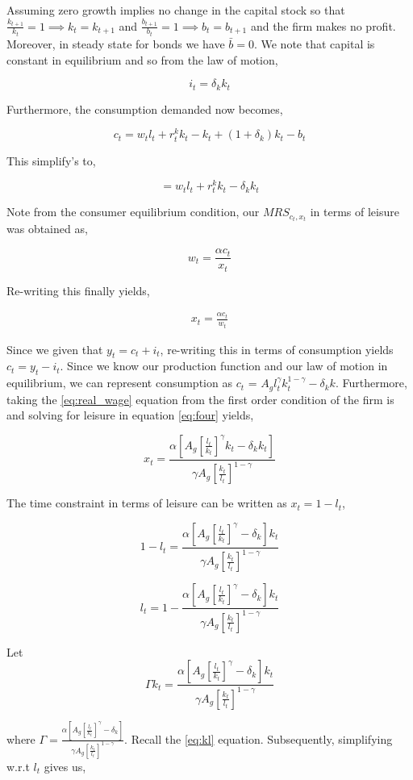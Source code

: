 \documentclass[
  11pt,
  justified]{article}
\begin{document}
Assuming zero growth implies no change in the capital stock so that
\(\frac{k_{t+1}}{k_t} = 1 \implies k_t = k_{t+1}\) and
\(\frac{b_{t+1}}{b_t} = 1 \implies b_t = b_{t+1}\) and the firm makes no
profit. Moreover, in steady state for bonds we have \(\bar b = 0\). We
note that capital is constant in equilibrium and so from the law of
motion,

\[
i_t = \delta_k k_t
\]

Furthermore, the consumption demanded now becomes,

\[
c_t = w_tl_t + r_t^k k_t - k_{t} + (1+\delta_k)k_t - b_{t}
\]

This simplify's to,

\[
= w_tl_t + r_t^k k_t - \delta_kk_t 
\]

Note from the consumer equilibrium condition, our \(MRS_{c_t, x_t}\) in
terms of leisure was obtained as,

\[
w_t = \frac{\alpha c_t}{x_t}
\]

Re-writing this finally yields,

\begin{align}
x_t = \frac{\alpha c_t}{w_t} \tag{4} \label{eq:four}
\end{align}

Since we given that \(y_t = c_t + i_t\), re-writing this in terms of
consumption yields \(c_t = y_t - i_t\). Since we know our production
function and our law of motion in equilibrium, we can represent
consumption as \(c_t\) =
\(A_g l_t^{\gamma} k_t^{1-\gamma} - \delta_k k\). Furthermore, taking
the \ref{eq:real_wage} equation from the first order condition of the
firm is and solving for leisure in equation \ref{eq:four} yields,

\[
x_t = \frac{\alpha [A_g [\frac{l_t}{k_t}]^{\gamma} k_t - \delta_k k_t]}{ \gamma A_g [\frac{k_t}{l_t}]^{1- \gamma}}
\]

The time constraint in terms of leisure can be written as
\(x_t = 1- l_t\),

\[
1 - l_t = \frac{\alpha [A_g [\frac{l_t}{k_t}]^{\gamma} - \delta_k ] k_t}{ \gamma A_g [\frac{k_t}{l_t}]^{1-\gamma}}
\]

\[
l_t = 1 - \frac{\alpha [A_g [\frac{l_t}{k_t}]^{\gamma} - \delta_k] k_t}{ \gamma A_g [\frac{k_t}{l_t}]^{1-\gamma}}  
\]

Let \[
\Gamma k_t = \frac{\alpha [A_g [\frac{l_t}{k_t}]^{\gamma} - \delta_k]k_t}{ \gamma A_g [\frac{k_t}{l_t}]^{1-\gamma}}
\]

where
\(\Gamma = \frac{\alpha [A_g [\frac{l_t}{k_t}]^{\gamma} - \delta_k]}{ \gamma A_g [\frac{k_t}{l_t}]^{1-\gamma}}\).
Recall the \ref{eq:kl} equation. Subsequently, simplifying w.r.t \(l_t\)
gives us,
\end{document}
